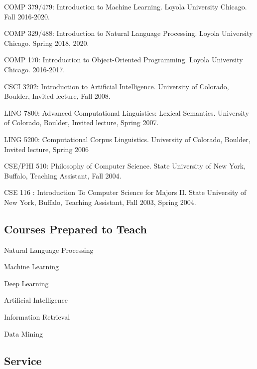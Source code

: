 \documentclass[letterpaper]{article}
\renewenvironment{itemize}{
  \begin{list}{}{
    \setlength{\leftmargin}{1.5em}
  }
}{
  \end{list}
}
\begin{document}
\begin{itemize}
\item COMP 379/479: Introduction to Machine Learning. Loyola University Chicago. Fall 2016-2020.
\item COMP 329/488: Introduction to Natural Language Processing. Loyola University Chicago. Spring 2018, 2020.
\item COMP 170: Introduction to Object-Oriented Programming. Loyola University Chicago. 2016-2017.
\item CSCI 3202: Introduction to Artificial Intelligence. University of Colorado, Boulder, Invited lecture, Fall 2008.
\item LING 7800: Advanced Computational Linguistics: Lexical Semantics. University of Colorado, Boulder, Invited lecture, Spring 2007.
\item LING 5200: Computational Corpus Linguistics. University of Colorado, Boulder, Invited lecture, Spring 2006
\item CSE/PHI 510: Philosophy of Computer Science. State University of New York, Buffalo, Teaching Assistant, Fall 2004.
\item CSE 116 : Introduction To Computer Science for Majors II. State University of New York, Buffalo, Teaching Assistant, Fall 2003, Spring 2004.
\end{itemize}

\subsection*{Courses Prepared to Teach}

\begin{itemize}
\item Natural Language Processing
\item Machine Learning
\item Deep Learning
\item Artificial Intelligence
\item Information Retrieval
\item Data Mining
\end{itemize}

\subsection*{Service}
\end{document}
